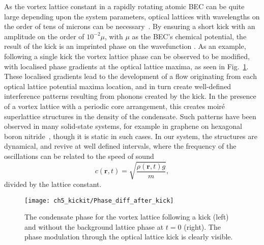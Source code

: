 As the vortex lattice constant in a rapidly rotating atomic BEC can be quite large depending upon the system parameters, optical lattices with wavelengths on the order of tens of microns can be necessary~\cite{BEC:Fallani_optexp_2005, AO:Williams_optexp_2008}. By ensuring a short kick with an amplitude on the order of $10^{-2} \mu $, with $\mu$ as the BEC's chemical potential, the result of the kick is an imprinted phase on the wavefunction \cite{Vtx:Dobrek_pra_1999}. As an example, following a single kick the vortex lattice phase can be observed to be modified, with localised phase gradients at the optical lattice maxima, as seen in Fig.~\ref{fig:Phase_diff_after_kick}. These localised gradients lead to the development of a flow originating from each optical lattice potential maxima location, and in turn create well-defined interference patterns resulting from phonons created by the kick. In the presence of a vortex lattice with a periodic core arrangement, this creates moir\'e superlattice structures \cite{SS:Murata_acsn_2010} in the density of the condensate. Such patterns have been observed in many solid-state systems, for example in graphene on hexagonal boron nitride~\cite{SS:Yankowitz_natphys_2012}, though it is static in such cases. In our system, the structures are dynamical, and revive at well defined intervals, where the frequency of the oscillations can be related to the speed of sound
\begin{equation}
c(\textbf{r},t) = \sqrt{\frac{\rho (\textbf{r},t) g}{m}},
\end{equation}
divided by the lattice constant.

\begin{figure}
    \centering
    \texttt{[image: ch5\_kickit/Phase\_diff\_after\_kick]}
    \caption[Phase modulation following a kick.]{The condensate phase for the vortex lattice following a kick (left) and without the background lattice phase at $t=0$ (right). The phase modulation through the optical lattice kick is clearly visible.}
    \label{fig:Phase_diff_after_kick}
\end{figure}


